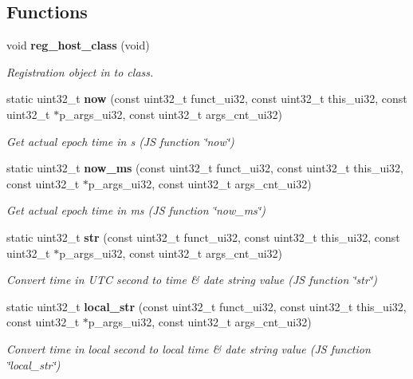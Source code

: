 \subsection*{Functions}
\begin{DoxyCompactItemize}
\item 
void \textbf{ reg\+\_\+host\+\_\+class} (void)
\begin{DoxyCompactList}\small\item\em Registration object in to class. \end{DoxyCompactList}\item 
static uint32\+\_\+t \textbf{ now} (const uint32\+\_\+t funct\+\_\+ui32, const uint32\+\_\+t this\+\_\+ui32, const uint32\+\_\+t $\ast$p\+\_\+args\+\_\+ui32, const uint32\+\_\+t args\+\_\+cnt\+\_\+ui32)
\begin{DoxyCompactList}\small\item\em Get actual epoch time in s (JS function \char`\"{}now\char`\"{}) \end{DoxyCompactList}\item 
static uint32\+\_\+t \textbf{ now\+\_\+ms} (const uint32\+\_\+t funct\+\_\+ui32, const uint32\+\_\+t this\+\_\+ui32, const uint32\+\_\+t $\ast$p\+\_\+args\+\_\+ui32, const uint32\+\_\+t args\+\_\+cnt\+\_\+ui32)
\begin{DoxyCompactList}\small\item\em Get actual epoch time in ms (JS function \char`\"{}now\+\_\+ms\char`\"{}) \end{DoxyCompactList}\item 
static uint32\+\_\+t \textbf{ str} (const uint32\+\_\+t funct\+\_\+ui32, const uint32\+\_\+t this\+\_\+ui32, const uint32\+\_\+t $\ast$p\+\_\+args\+\_\+ui32, const uint32\+\_\+t args\+\_\+cnt\+\_\+ui32)
\begin{DoxyCompactList}\small\item\em Convert time in U\+TC second to time \& date string value (JS function \char`\"{}str\char`\"{}) \end{DoxyCompactList}\item 
static uint32\+\_\+t \textbf{ local\+\_\+str} (const uint32\+\_\+t funct\+\_\+ui32, const uint32\+\_\+t this\+\_\+ui32, const uint32\+\_\+t $\ast$p\+\_\+args\+\_\+ui32, const uint32\+\_\+t args\+\_\+cnt\+\_\+ui32)
\begin{DoxyCompactList}\small\item\em Convert time in local second to local time \& date string value (JS function \char`\"{}local\+\_\+str\char`\"{}) \end{DoxyCompactList}\end{DoxyCompactItemize}

